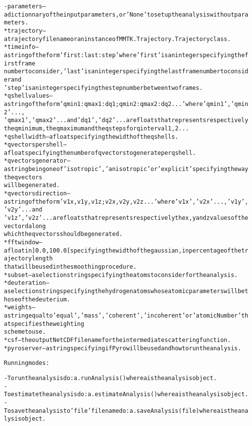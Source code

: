 \begin{alltt}
    - {\textbar}parameters{\textbar} -- a dictionnary of the input parameters, or 'None' to set up the analysis without parameters.
        * trajectory        -- a trajectory file name or an instance of MMTK.Trajectory.Trajectory class.
        * timeinfo          -- a string of the form 'first:last:step' where 'first' is an integer specifying the first frame 
                               number to consider, 'last' is an integer specifying the last frame number to consider and 
                               'step' is an integer specifying the step number between two frames.
        * qshellvalues      -- a string of the form 'qmin1:qmax1:dq1;qmin2:qmax2:dq2...' where 'qmin1', 'qmin2' ... , 
                               'qmax1', 'qmax2' ... and 'dq1', 'dq2' ... are floats that represents respectively 
                               the q minimum, the q maximum and the q steps for q interval 1, 2 ...
        * qshellwidth       -- a float specifying the width of the q shells.
        * qvectorspershell  -- a float specifying the number of q vectors to generate per q shell.
        * qvectorsgenerator -- a string being one of 'isotropic', 'anisotropic' or 'explicit' specifying the way the q vectors
                               will be generated.
        * qvectorsdirection -- a string of the form 'v1x,v1y,v1z;v2x,v2y,v2z...' where 'v1x', 'v2x' ..., 'v1y', 'v2y' ... and
                               'v1z', 'v2z' ... are floats that represents respectively the x, y and z values of the vectord along 
                               which the q vectors should be generated.
        * fftwindow         -- a float in ]0.0,100.0[ specifying the width of the gaussian, in percentage of the trajectory length
                               that will be used in the smoothing procedure.
        * subset            -- a selection string specifying the atoms to consider for the analysis.
        * deuteration       -- a selection string specifying the hydrogen atoms whose atomic parameters will be those of the deuterium.
        * weights           -- a string equal to 'equal', 'mass', 'coherent' , 'incoherent' or 'atomicNumber' that specifies the weighting
                               scheme to use.
        * csf               -- the output NetCDF file name for the intermediate scattering function.
        * pyroserver        -- a string specifying if Pyro will be used and how to run the analysis.
    
Running modes:

    - To run the analysis do: a.runAnalysis() where a is the analysis object.
    - To estimate the analysis do: a.estimateAnalysis() where a is the analysis object.
    - To save the analysis to 'file' file name do: a.saveAnalysis(file) where a is the analysis object.
    
\end{alltt}


